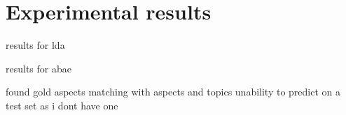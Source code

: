 \section{Experimental results}
results for lda

results for abae

found gold aspects matching with aspects and topics
unability to predict on a test set as i dont have one